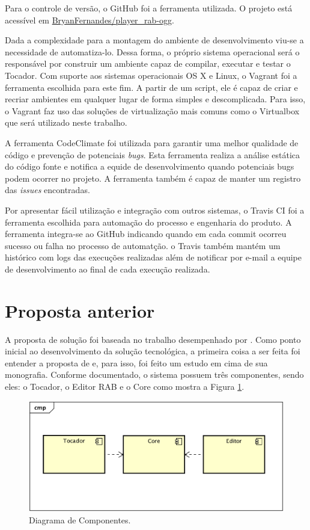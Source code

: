 Para o controle de versão, o GitHub foi a ferramenta utilizada. O projeto está acessível em \href{https://github.com/BryanFernandes/player_rab-ogg}{BryanFernandes/player\_rab-ogg}.

Dada a complexidade para a montagem do ambiente de desenvolvimento viu-se a necessidade de automatiza-lo. Dessa forma, o próprio sistema operacional será o responsável por construir um ambiente capaz de compilar, executar e testar o Tocador. Com suporte aos sistemas operacionais OS X e Linux, o Vagrant foi a ferramenta escolhida para este fim. A partir de um script, ele é capaz de criar e recriar ambientes em qualquer lugar de forma simples e descomplicada. Para isso, o Vagrant faz uso das soluções de virtualização mais comuns como o Virtualbox que será utilizado neste trabalho.

A ferramenta CodeClimate foi utilizada para garantir uma melhor qualidade de código e prevenção de potenciais \textit{bugs}. Esta ferramenta realiza a análise estática do código fonte e notifica a equide de desenvolvimento quando potenciais bugs podem ocorrer no projeto. A ferramenta também é capaz de manter um registro das \textit{issues} encontradas.

Por apresentar fácil utilização e integração com outros sistemas, o Travis CI foi a ferramenta escolhida para automação do processo e engenharia do produto. A ferramenta integra-se ao GitHub indicando quando em cada commit ocorreu sucesso ou falha no processo de automatção. o Travis também mantém um histórico com logs das execuções realizadas além de notificar por e-mail a equipe de desenvolvimento ao final de cada execução realizada.

\section{Proposta anterior}

A proposta de solução foi baseada no trabalho desempenhado por \cite{herbert}. Como ponto inicial ao desenvolvimento da solução tecnológica, a primeira coisa a ser feita foi entender a proposta de \cite{herbert} e, para isso, foi feito um estudo em cima de sua monografia. Conforme documentado, o sistema possuem três componentes, sendo eles: o Tocador, o Editor RAB e o Core como mostra a Figura \ref{components}.

 \begin{figure}[ht]
	\centering
		\includegraphics[keepaspectratio=true,scale=0.5]{figuras/components.eps}
	\caption{Diagrama de Componentes.}
	\label{components}
\end{figure}

